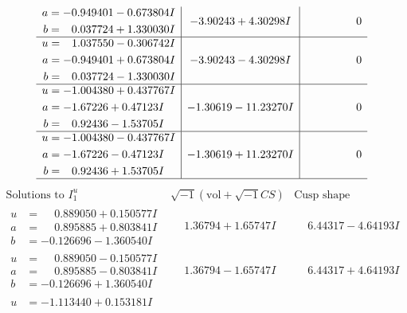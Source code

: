 \documentclass[1p]{elsarticle_modified}
\theoremstyle{definition}
\newcommand{\I}{\sqrt{-1}}
\begin{document}
$$\begin{array}{c|c|c}
\begin{aligned}
a &= -0.949401 - 0.673804 I \\
b &= \phantom{-}0.037724 + 1.330030 I\end{aligned}
 & -3.90243 + 4.30298 I & \phantom{-0.000000 } 0 \\ \hline\begin{aligned}
u &= \phantom{-}1.037550 - 0.306742 I \\
a &= -0.949401 + 0.673804 I \\
b &= \phantom{-}0.037724 - 1.330030 I\end{aligned}
 & -3.90243 - 4.30298 I & \phantom{-0.000000 } 0 \\ \hline\begin{aligned}
u &= -1.004380 + 0.437767 I \\
a &= -1.67226 + 0.47123 I \\
b &= \phantom{-}0.92436 - 1.53705 I\end{aligned}
 & -1.30619 - 11.23270 I & \phantom{-0.000000 } 0 \\ \hline\begin{aligned}
u &= -1.004380 - 0.437767 I \\
a &= -1.67226 - 0.47123 I \\
b &= \phantom{-}0.92436 + 1.53705 I\end{aligned}
 & -1.30619 + 11.23270 I & \phantom{-0.000000 } 0\\
 \hline 
 \end{array}$$\newpage$$\begin{array}{c|c|c}  
\text{Solutions to }I^u_{1}& \I (\text{vol} + \sqrt{-1}CS) & \text{Cusp shape}\\
 \hline 
\begin{aligned}
u &= \phantom{-}0.889050 + 0.150577 I \\
a &= \phantom{-}0.895885 + 0.803841 I \\
b &= -0.126696 - 1.360540 I\end{aligned}
 & \phantom{-}1.36794 + 1.65747 I & \phantom{-}6.44317 - 4.64193 I \\ \hline\begin{aligned}
u &= \phantom{-}0.889050 - 0.150577 I \\
a &= \phantom{-}0.895885 - 0.803841 I \\
b &= -0.126696 + 1.360540 I\end{aligned}
 & \phantom{-}1.36794 - 1.65747 I & \phantom{-}6.44317 + 4.64193 I \\ \hline\begin{aligned}
u &= -1.113440 + 0.153181 I \\

\end{aligned}
\end{array}$$
\end{document}
